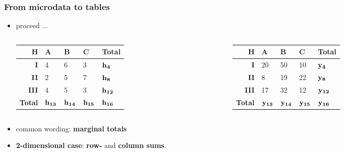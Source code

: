 \begin{frame}\frametitle{From microdata to tables}
	\begin{itemize}
		\item proceed ... 
		\begin{center}
		\begin{columns}
			\begin{column}{5cm}
				\begin{tabular}{|r|lll|l|}
				\hline
				{\bf H} & {\bf A} & {\bf B} & {\bf C} & {\bf Total} \\
				\hline
				{\bf I} 	& 4 & 6 & 3 & $\mathbf{h_4}$ \\
				{\bf II} 	& 2 & 5 & 7 & $\mathbf{h_8}$ \\
				{\bf III}   & 4 & 5 & 3 & $\mathbf{h_{12}}$ \\
				\hline
				{\bf Total} & $\mathbf{h_{13}}$ & $\mathbf{h_{14}}$ & $\mathbf{h_{15}}$ & $\mathbf{h_{16}}$ \\
				\hline
				\end{tabular}			
			\end{column}
			\begin{column}{5cm}
				\begin{tabular}{|r|lll|l|}
				\hline
				{\bf H} & {\bf A} & {\bf B} & {\bf C} & {\bf Total} \\
				\hline
				{\bf I} 	& 20 & 50 & 10 & $\mathbf{y_4}$ \\
				{\bf II} 	& 8 & 19 & 22 & $\mathbf{y_8}$ \\
				{\bf III}   & 17 & 32 & 12 & $\mathbf{y_{12}}$ \\
				\hline
				{\bf Total} & $\mathbf{y_{13}}$ & $\mathbf{y_{14}}$ & $\mathbf{y_{15}}$ & $\mathbf{y_{16}}$
				\\
				\hline
				\end{tabular}				
			\end{column}			
		\end{columns}
		\end{center}	
		
		\pause
		\item common wording: {\bf marginal totals} \pause
		\item {\bf 2-dimensional case}: {\bf row-} and {\bf column sums}. \\
	\end{itemize}
\end{frame}
% 
